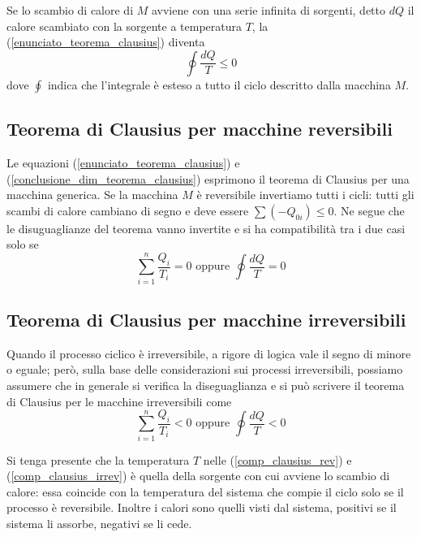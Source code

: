\documentclass[class=book, crop=false, oneside, 12pt]{standalone}
\begin{document}
Se lo scambio di calore di \(M\) avviene con una serie infinita di sorgenti, detto \(d Q\) il calore scambiato con la sorgente a temperatura \(T\), la (\ref{enunciato_teorema_clausius}) diventa
\begin{equation} \label{conclusione_dim_teorema_clausius}
    \oint \frac{d Q}{T} \leq 0
\end{equation}
dove \(\oint\) indica che l'integrale è esteso a tutto il ciclo descritto dalla macchina \(M\).

\subsection{Teorema di Clausius per macchine reversibili}

Le equazioni (\ref{enunciato_teorema_clausius}) e (\ref{conclusione_dim_teorema_clausius}) esprimono il teorema di Clausius per una macchina generica.
Se la macchina \(M\) è reversibile invertiamo tutti i cicli: tutti gli scambi di calore cambiano di segno e deve essere \(\sum \left(-Q_{0i}\right) \leq 0\). 
Ne segue che le disuguaglianze del teorema vanno invertite e si ha compatibilità tra i due casi solo se 
\begin{equation} \label{comp_clausius_rev}
    \sum_{i = 1}^{n} \frac{Q_i}{T_i} = 0 \text{ oppure } \oint \frac{d Q}{T} = 0
\end{equation}

\subsection{Teorema di Clausius per macchine irreversibili}

Quando il processo ciclico è irreversibile, a rigore di logica vale il segno di minore o eguale; 
però, sulla base delle considerazioni sui processi irreversibili, possiamo assumere che in generale si verifica la diseguaglianza e si può scrivere il teorema di Clausius per le macchine irreversibili come
\begin{equation} \label{comp_clausius_irrev}
    \sum_{i = 1}^{n} \frac{Q_i}{T_i} < 0 \text{ oppure } \oint \frac{d Q}{T} < 0
\end{equation} 

Si tenga presente che la temperatura \(T\) nelle (\ref{comp_clausius_rev}) e (\ref{comp_clausius_irrev}) è quella della sorgente con cui avviene lo scambio di calore: essa coincide con la temperatura del sistema che compie il ciclo solo se il processo è reversibile. 
Inoltre i calori sono quelli visti dal sistema, positivi se il sistema li assorbe, negativi se li cede.
\end{document}
